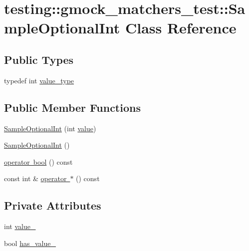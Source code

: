 \hypertarget{classtesting_1_1gmock__matchers__test_1_1_sample_optional_int}{}\section{testing\+::gmock\+\_\+matchers\+\_\+test\+::Sample\+Optional\+Int Class Reference}
\label{classtesting_1_1gmock__matchers__test_1_1_sample_optional_int}
\subsection*{Public Types}
\begin{DoxyCompactItemize}
\item 
typedef int \mbox{\hyperlink{classtesting_1_1gmock__matchers__test_1_1_sample_optional_int_a9f1309a849993c56be680fc5468bf01a}{value\+\_\+type}}
\end{DoxyCompactItemize}
\subsection*{Public Member Functions}
\begin{DoxyCompactItemize}
\item 
\mbox{\hyperlink{classtesting_1_1gmock__matchers__test_1_1_sample_optional_int_aa0e9539a55f97693e24230e5857f7297}{Sample\+Optional\+Int}} (int \mbox{\hyperlink{_obj__test_2lib_2googletest-master_2googlemock_2test_2gmock-matchers__test_8cc_a337b8a670efc0b086ad3af163f3121b6}{value}})
\item 
\mbox{\hyperlink{classtesting_1_1gmock__matchers__test_1_1_sample_optional_int_a4181e03aaad80004e9c97394cb610565}{Sample\+Optional\+Int}} ()
\item 
\mbox{\hyperlink{classtesting_1_1gmock__matchers__test_1_1_sample_optional_int_a1e638b606b7e48b395a76304153c8f17}{operator bool}} () const
\item 
const int \& \mbox{\hyperlink{classtesting_1_1gmock__matchers__test_1_1_sample_optional_int_a5e97f4536a008ab6f86b842a1e697532}{operator $\ast$}} () const
\end{DoxyCompactItemize}
\subsection*{Private Attributes}
\begin{DoxyCompactItemize}
\item 
int \mbox{\hyperlink{classtesting_1_1gmock__matchers__test_1_1_sample_optional_int_a0131764dc86ee2be004977be64e6b418}{value\+\_\+}}
\item 
bool \mbox{\hyperlink{classtesting_1_1gmock__matchers__test_1_1_sample_optional_int_a5910c497044c5f7bee428a796917d306}{has\+\_\+value\+\_\+}}
\end{DoxyCompactItemize}


